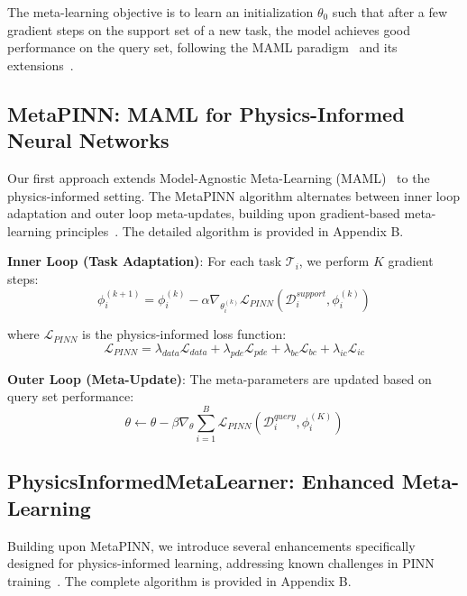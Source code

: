 \documentclass[review]{elsarticle}
\begin{document}
The meta-learning objective is to learn an initialization $\theta_0$ such that after a few gradient steps on the support set of a new task, the model achieves good performance on the query set, following the MAML paradigm~\cite{finn2017model} and its extensions~\cite{li2017meta,rajeswaran2019meta}.

\subsection{MetaPINN: MAML for Physics-Informed Neural Networks}

Our first approach extends Model-Agnostic Meta-Learning (MAML)~\cite{finn2017model} to the physics-informed setting. The MetaPINN algorithm alternates between inner loop adaptation and outer loop meta-updates, building upon gradient-based meta-learning principles~\cite{nichol2018first,antoniou2018train}. The detailed algorithm is provided in Appendix B.

\textbf{Inner Loop (Task Adaptation)}: For each task $\mathcal{T}_i$, we perform $K$ gradient steps:
\begin{equation}
\phi_i^{(k+1)} = \phi_i^{(k)} - \alpha \nabla_{\theta_i^{(k)}} \mathcal{L}_{PINN}(\mathcal{D}_i^{support}, \phi_i^{(k)})
\end{equation}

where $\mathcal{L}_{PINN}$ is the physics-informed loss function:
\begin{equation}
\mathcal{L}_{PINN} = \lambda_{data} \mathcal{L}_{data} + \lambda_{pde} \mathcal{L}_{pde} + \lambda_{bc} \mathcal{L}_{bc} + \lambda_{ic} \mathcal{L}_{ic}
\end{equation}

\textbf{Outer Loop (Meta-Update)}: The meta-parameters are updated based on query set performance:
\begin{equation}
\theta \leftarrow \theta - \beta \nabla_\theta \sum_{i=1}^{B} \mathcal{L}_{PINN}(\mathcal{D}_i^{query}, \phi_i^{(K)})
\end{equation}

\subsection{PhysicsInformedMetaLearner: Enhanced Meta-Learning}

Building upon MetaPINN, we introduce several enhancements specifically designed for physics-informed learning, addressing known challenges in PINN training~\cite{wang2021understanding,wang2022when,krishnapriyan2021characterizing}. The complete algorithm is provided in Appendix B.
\end{document}
